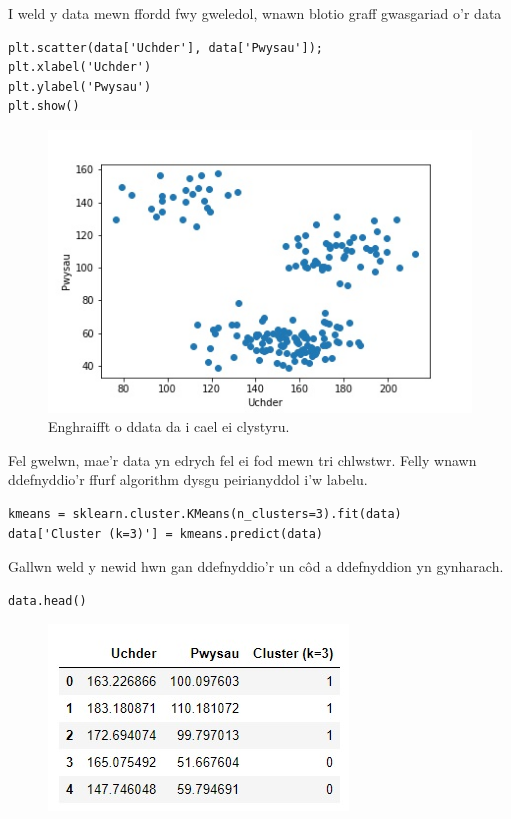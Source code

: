 I weld y data mewn ffordd fwy gweledol, wnawn blotio graff gwasgariad o'r data

\begin{verbatim}
plt.scatter(data['Uchder'], data['Pwysau']);
plt.xlabel('Uchder')
plt.ylabel('Pwysau')
plt.show()
\end{verbatim}

\begin{figure}[H]
\begin{center}
\includegraphics[width=0.7\linewidth]{../img/Scatterpython.jpeg}
\end{center}
\caption{Enghraifft o ddata da i cael ei clystyru.}
\label{fig:Scatterpython}
\end{figure}

Fel gwelwn, mae'r data yn edrych fel ei fod mewn tri chlwstwr. Felly wnawn ddefnyddio'r ffurf algorithm dysgu peirianyddol i'w labelu.

\begin{verbatim}
kmeans = sklearn.cluster.KMeans(n_clusters=3).fit(data)
data['Cluster (k=3)'] = kmeans.predict(data)
\end{verbatim}

Gallwn weld y newid hwn gan ddefnyddio'r un c\^{o}d a ddefnyddion yn gynharach.

\begin{verbatim}
data.head()
\end{verbatim}

\begin{figure}[H]
\begin{center}
\includegraphics[width=0.35\linewidth]{../img/tabl2.jpg}
\end{center}
\label{fig:Data2}
\end{figure}

